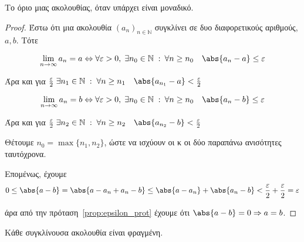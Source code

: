 \documentclass[main.tex]{subfiles}
\begin{document}
\begin{thm}
    Το όριο μιας ακολουθίας, όταν υπάρχει είναι μοναδικό.
\end{thm}

\begin{proof}
    Έστω ότι μια ακολουθία $ (a_{n})_{n \in \mathbb{N}} $ συγκλίνει σε δυο 
    διαφορετικούς αριθμούς, $ a,b $. Τότε

    \[ 
        \lim_{n \to \infty} a_{n} = a \Leftrightarrow \forall \varepsilon >
        0, \; \exists n_{0} \in \mathbb{N} \; : \: \forall n \geq n_{0} 
        \quad \abs{a_{n}- a} \leq \varepsilon 
    \]

    Άρα και για $ \frac{\varepsilon}{2} \; \exists n_{1} \in \mathbb{N} \; 
    : \; \forall n \geq n_{1} \quad \abs{a_{n_{1}} - a} < 
    \frac{\varepsilon}{2}  $

    \[ 
        \lim_{n \to \infty} a_{n} = b \Leftrightarrow \forall \varepsilon 
        > 0, \; \exists n_{0} \in \mathbb{N} \; : \: \forall n \geq n_{0} 
        \quad \abs{a_{n}- b} \leq \varepsilon 
    \]

    Άρα και για $ \frac{\varepsilon}{2} \; \exists n_{2} \in \mathbb{N} \; 
    : \; \forall n \geq n_{2}  \quad \abs{a_{n_{2}} - b} < 
    \frac{\varepsilon}{2}  $

    Θέτουμε $ n_{0} = \max \{ n_{1}, n_{2} \} $, ώστε να ισχύουν οι κ οι 
    δύο παραπάνω ανισότητες ταυτόχρονα. 

    Επομένως, έχουμε 
    \[
        0 \leq \abs{a-b} = \abs{a- a_{n}+ a_{n}- b} \leq \abs{a- a_{n}} + 
        \abs{a_{n}- b} < \frac{\varepsilon}{2} + \frac{\varepsilon}{2} 
        = \varepsilon 
     \] 

     άρα από την πρόταση~\ref{prop:epsilon_prot} έχουμε ότι $ \abs{a-b} = 0 \Rightarrow a=b $.
\end{proof}


\begin{thm}
    Κάθε συγκλίνουσα ακολουθία είναι φραγμένη.
\end{thm}
\end{document}
